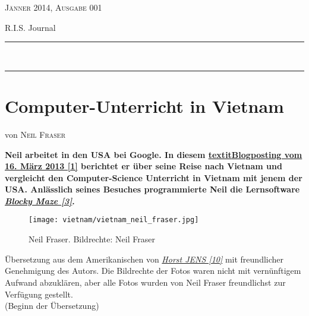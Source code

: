 \documentclass[10pt,a4paper,ngerman,twoside]{article} %
\newcommand{\HorRule}[1]{\noindent\rule{\linewidth}{#1}} %
\newcommand{\NewsletterName}[1]{ %
\begin{center}
\Huge \usefont{T1}{fvs}{b}{n} %
#1
\end{center}	
\par \normalsize \normalfont}
\newcommand{\JournalIssue}[1]{ %
\hfill \textsc{Jänner 2014, Ausgabe 001}
\par \normalsize \normalfont}
\newcommand{\NewsItem}[1]{ %
\usefont{T1}{fvs}{n}{n} %
\vspace{24pt}\large #1\vspace{3pt} %
\par \normalsize \normalfont}
\newcommand{\NewsAuthor}[1]{ %
\hfill von \textsc{#1} \vspace{20pt} %
\par \normalfont}
\begin{document}
\JournalIssue{1} %
\NewsletterName{R.I.S. Journal} %
\noindent\HorRule{3pt} \\[-0.75\baselineskip] %
\HorRule{1pt} %




%

\NewsItem{}
\section*{Computer-Unterricht in Vietnam}
\label{vietnam}
\NewsAuthor{Neil Fraser}

\textbf{Neil arbeitet in den USA bei Google. In diesem \href{http://neil.fraser.name/news/2013/03/16/}{textit{Blogposting vom 16. M\"arz 2013 [1]}} berichtet er über seine Reise nach Vietnam und vergleicht den Computer-Science Unterricht in Vietnam mit jenem der USA. Anlässlich seines Besuches programmierte Neil die Lernsoftware \href{http://blockly-demo.appspot.com/static/apps/maze/en.html?level=1}{\textit{Blocky Maze [3]}}.} 

\begin{figure}
\texttt{[image: vietnam/vietnam\_neil\_fraser.jpg]} \\
\caption{Neil Fraser. Bildrechte: Neil Fraser}
\end{figure}

Übersetzung aus dem Amerikanischen von \href{http://spielend-programmieren.at}{\textit{Horst JENS [10]}}  mit freundlicher Genehmigung des Autors. Die Bildrechte der Fotos waren nicht mit vernünftigem Aufwand abzuklären, aber alle Fotos wurden von Neil Fraser freundlichst zur Verfügung gestellt. \\

(Beginn der Übersetzung) \\
\end{document}
